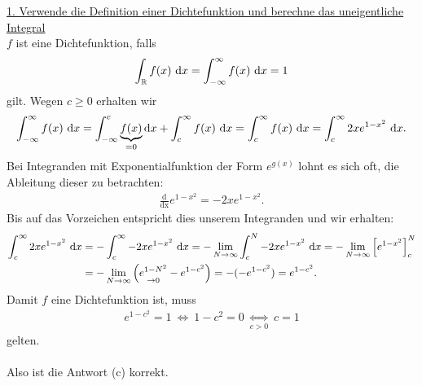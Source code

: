 \underline{1. Verwende die Definition einer Dichtefunktion und berechne das uneigentliche Integral}\\
$ f $ ist eine Dichtefunktion, falls
\begin{align*}
	\int_{\mathbb{R}} f(x) \ \text{\rmfamily d} x
	=
	\int^\infty_{-\infty} f(x) \ \text{\rmfamily d} x
	=1
\end{align*} 
gilt. Wegen $ c \geq 0 $ erhalten wir
\begin{align*}
	\int^\infty_{-\infty} f(x) \ \text{\rmfamily d} x
	=
	\int_{-\infty}^c \underbrace{f(x)}_{=0} \text{\rmfamily d} x +
	\int_c^\infty f(x) \ \text{\rmfamily d} x
	=
	\int_c^\infty f(x) \ \text{\rmfamily d} x
	=
	\int_c^\infty 2x e^{1-x^2} \ \text{\rmfamily d} x
	.
\end{align*}
Bei Integranden mit Exponentialfunktion der Form $ e^{g(x)} $ lohnt es sich oft, die Ableitung dieser zu betrachten:
\begin{align*}
	\frac{\mathrm{d}}{\mathrm{dx}} e^{1-x^2}
	= -2x e^{1-x^2}.
\end{align*}
Bis auf das Vorzeichen entspricht dies unserem Integranden und wir erhalten: 
\begin{align*}
	\int_c^\infty 2x e^{1-x^2} \ \text{\rmfamily d} x
	&=
	-\int_c^\infty -2x e^{1-x^2} \ \text{\rmfamily d} x
	=
	- \lim \limits_{N \to \infty}
	 \int_c^N -2x e^{1-x^2} \ \text{\rmfamily d} x
	 =
	 -\lim \limits_{N \to \infty}
	 \left[e^{1-x^2}\right]_c^N\\
	 &=
	 - \lim \limits_{N \to \infty}
	 \left( \underset{ \to 0}{e^{1-N^2}}- e^{1-c^2}\right)
	 =-(-e^{1-c^2}) = e^{1-c^2}.
\end{align*}
Damit $ f $ eine Dichtefunktion ist, muss
\begin{align*}
	e^{1-c^2} = 1 \ \Leftrightarrow \
	1-c^2 = 0 \ \underset{c >0}{\Leftrightarrow} \
	c = 1
\end{align*}
gelten.\\
\\
Also ist die Antwort (c) korrekt.
\newpage

